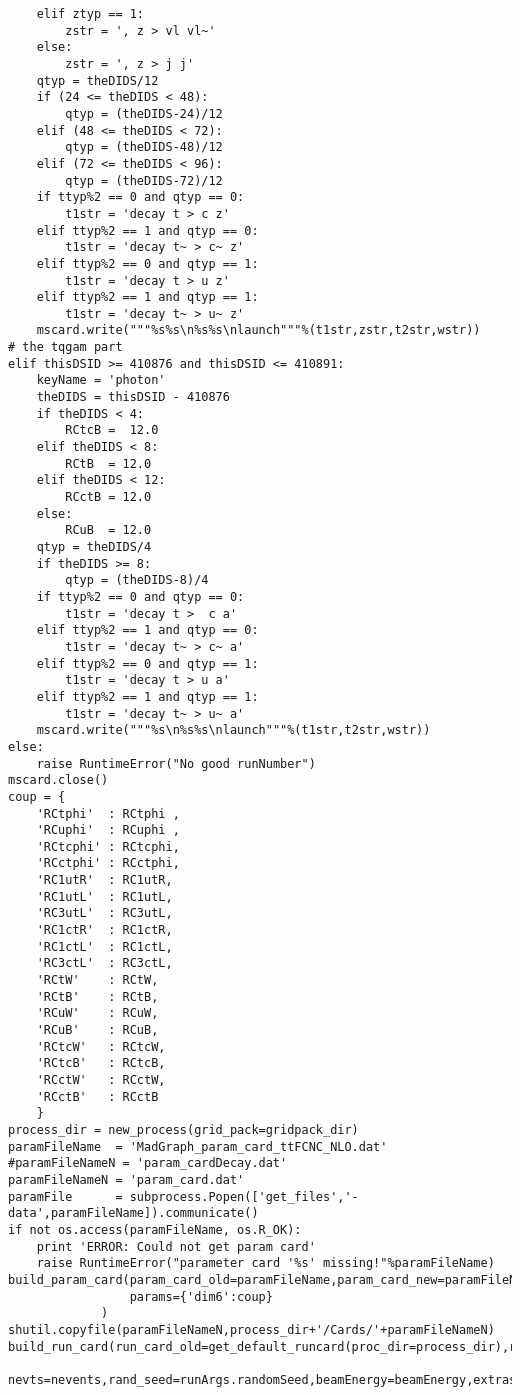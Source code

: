 \begin{tiny}
\begin{verbatim}
    elif ztyp == 1:
        zstr = ', z > vl vl~'
    else:
        zstr = ', z > j j'
    qtyp = theDIDS/12
    if (24 <= theDIDS < 48):
        qtyp = (theDIDS-24)/12
    elif (48 <= theDIDS < 72):
        qtyp = (theDIDS-48)/12
    elif (72 <= theDIDS < 96):
        qtyp = (theDIDS-72)/12
    if ttyp%2 == 0 and qtyp == 0:
        t1str = 'decay t > c z'
    elif ttyp%2 == 1 and qtyp == 0:
        t1str = 'decay t~ > c~ z'
    elif ttyp%2 == 0 and qtyp == 1:
        t1str = 'decay t > u z'
    elif ttyp%2 == 1 and qtyp == 1:
        t1str = 'decay t~ > u~ z'
    mscard.write("""%s%s\n%s%s\nlaunch"""%(t1str,zstr,t2str,wstr))
# the tqgam part
elif thisDSID >= 410876 and thisDSID <= 410891:
    keyName = 'photon'
    theDIDS = thisDSID - 410876
    if theDIDS < 4:
        RCtcB =  12.0
    elif theDIDS < 8:
        RCtB  = 12.0
    elif theDIDS < 12:
        RCctB = 12.0
    else:
        RCuB  = 12.0
    qtyp = theDIDS/4
    if theDIDS >= 8:
        qtyp = (theDIDS-8)/4
    if ttyp%2 == 0 and qtyp == 0:
        t1str = 'decay t >  c a'
    elif ttyp%2 == 1 and qtyp == 0:
        t1str = 'decay t~ > c~ a'
    elif ttyp%2 == 0 and qtyp == 1:
        t1str = 'decay t > u a'
    elif ttyp%2 == 1 and qtyp == 1:
        t1str = 'decay t~ > u~ a'
    mscard.write("""%s\n%s%s\nlaunch"""%(t1str,t2str,wstr))
else:
    raise RuntimeError("No good runNumber")
mscard.close()
coup = {
    'RCtphi'  : RCtphi ,
    'RCuphi'  : RCuphi ,
    'RCtcphi' : RCtcphi,
    'RCctphi' : RCctphi,
    'RC1utR'  : RC1utR,
    'RC1utL'  : RC1utL,
    'RC3utL'  : RC3utL,
    'RC1ctR'  : RC1ctR,
    'RC1ctL'  : RC1ctL,
    'RC3ctL'  : RC3ctL,
    'RCtW'    : RCtW,
    'RCtB'    : RCtB,
    'RCuW'    : RCuW,
    'RCuB'    : RCuB,
    'RCtcW'   : RCtcW,
    'RCtcB'   : RCtcB,
    'RCctW'   : RCctW,
    'RCctB'   : RCctB
    }
process_dir = new_process(grid_pack=gridpack_dir)
paramFileName  = 'MadGraph_param_card_ttFCNC_NLO.dat'
#paramFileNameN = 'param_cardDecay.dat'
paramFileNameN = 'param_card.dat'
paramFile      = subprocess.Popen(['get_files','-data',paramFileName]).communicate()
if not os.access(paramFileName, os.R_OK):
    print 'ERROR: Could not get param card'
    raise RuntimeError("parameter card '%s' missing!"%paramFileName)
build_param_card(param_card_old=paramFileName,param_card_new=paramFileNameN,
                 params={'dim6':coup}
             )
shutil.copyfile(paramFileNameN,process_dir+'/Cards/'+paramFileNameN)
build_run_card(run_card_old=get_default_runcard(proc_dir=process_dir),run_card_new='run_card.dat',
               nevts=nevents,rand_seed=runArgs.randomSeed,beamEnergy=beamEnergy,extras=extras)

\end{verbatim}
\end{tiny}
